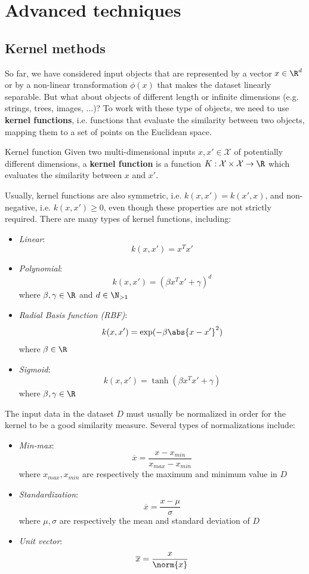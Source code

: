 \documentclass[a4paper, 12pt]{report}
\begin{document}
    \newpage

    \chapter{Advanced techniques}

    \section{Kernel methods}

    So far, we have considered input objects that are represented by a vector $x \in \R^d$ or by a non-linear transformation $\phi(x)$ that makes the dataset linearly separable. But what about objects of different length or infinite dimensions (e.g. strings, trees, images, ...)? To work with these type of objects, we need to use \textbf{kernel functions}, i.e. functions that evaluate the similarity between two objects, mapping them to a set of points on the Euclidean space.

    \begin{frameddefn}{Kernel function}
        Given two multi-dimensional inputs $x, x' \in \mathcal{X}$ of potentially different dimensions, a \textbf{kernel function} is a function $K : \mathcal{X} \times \mathcal{X} \to \R$ which evaluates the similarity between $x$ and $x'$. 
    \end{frameddefn}

    Usually, kernel functions are also symmetric, i.e. $k(x, x') = k(x', x)$, and non-negative, i.e. $k(x, x') \geq 0$, even though these properties are not strictly required. There are many types of kernel functions, including:
    \begin{itemize}
        \item \textit{Linear}:
        \[k(x,x') = x^Tx'\]
        \item \textit{Polynomial}:
        \[k(x,x') = (\beta x^T x' + \gamma)^d\]
        where $\beta, \gamma \in \R$ and $d \in \N_{> 1}$
        \item \textit{Radial Basis function (RBF)}:
        \[k(x,x') = \exp(-\beta \abs{x-x'}^2)\]
        where $\beta \in \R$
        \item \textit{Sigmoid}:
        \[k(x,x') = \tanh(\beta x^T x' + \gamma)\]
        where $\beta, \gamma \in \R$
    \end{itemize}
    
    The input data in the dataset $D$ must usually be normalized in order for the kernel to be a good similarity measure.
    Several types of normalizations include:
    \begin{itemize}
        \item \textit{Min-max}:
        \[\overline{x} = \frac{x-x_{min}}{x_{max}- x_{min}}\]
        where $x_{max}, x_{min}$ are respectively the maximum and minimum value in $D$
        \item \textit{Standardization}:
        \[\overline{x} = \frac{x-\mu}{\sigma}\]
        where $\mu, \sigma$ are respectively the mean and standard deviation of $D$
        \item \textit{Unit vector}:
        \[\overline{x} = \frac{x}{\norm{x}}\]
    \end{itemize}
\end{document}

